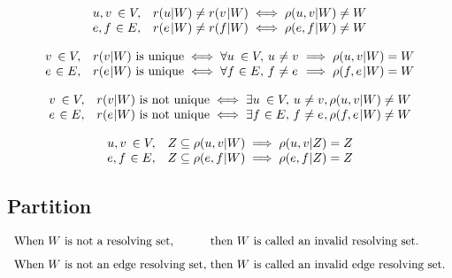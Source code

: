 \begin{corollary}
	\[\begin{array}{l@{\ }r l@{}l@{}l@{}l}
		u, v &\in V, & r(u&|W) \neq r(v&|W) \iff \rho(u,v&|W) \neq W \\
		e, f &\in E, & r(e&|W) \neq r(f&|W) \iff \rho(e,f&|W) \neq W
	\end{array}\]
\end{corollary}

\begin{lemma}
	\[\begin{array}{l@{\ }r l@{}l@{\ }r@{\ }r@{\ }l@{\ }l@{}l}
		v &\in V, & r(v&|W) \text{ is unique} \iff \forall u &\in V, & u &\neq v &\implies \rho(u,v&|W) = W \\
		e &\in E, & r(e&|W) \text{ is unique} \iff \forall f &\in E, & f &\neq e &\implies \rho(f,e&|W) = W
	\end{array}\]
\end{lemma}

\begin{corollary}
	\[\begin{array}{l@{\ }r l@{}l@{\ }r@{\ }r@{\ }l@{}l@{}l}
		v &\in V, & r(v&|W) \text{ is not unique} \iff \exists u &\in V, & u &\neq v &, \rho(u,v&|W) \neq W \\
		e &\in E, & r(e&|W) \text{ is not unique} \iff \exists f &\in E, & f &\neq e &, \rho(f,e&|W) \neq W
	\end{array}\]
\end{corollary}

\begin{lemma}
	\[\begin{array}{l@{\ }r l@{}l@{}l}
		u, v &\in V, & Z \subseteq \rho(u,v&|W) \implies \rho(u,v&|Z) = Z \\
		e, f &\in E, & Z \subseteq \rho(e,f&|W) \implies \rho(e,f&|Z) = Z
	\end{array}\]
\end{lemma}

\cleardoublepage
\subsection{Partition}

\begin{definition}
	\[\begin{array}{l@{\ }l}
		\text{When } W \text{ is not a resolving set,} &\text{then } W \text{ is called an invalid resolving set.} \\ [8pt]
		\text{When } W \text{ is not an edge resolving set,} &\text{then } W \text{ is called an invalid edge resolving set.}
	\end{array}\]
\end{definition}

